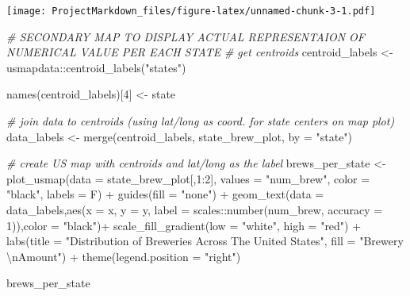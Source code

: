 \documentclass[
]{article}
\newenvironment{Shaded}{\begin{snugshade}}{\end{snugshade}}
\newcommand{\AttributeTok}[1]{\textcolor[rgb]{0.77,0.63,0.00}{#1}}
\newcommand{\CommentTok}[1]{\textcolor[rgb]{0.56,0.35,0.01}{\textit{#1}}}
\newcommand{\DecValTok}[1]{\textcolor[rgb]{0.00,0.00,0.81}{#1}}
\newcommand{\FunctionTok}[1]{\textcolor[rgb]{0.00,0.00,0.00}{#1}}
\newcommand{\NormalTok}[1]{#1}
\newcommand{\OtherTok}[1]{\textcolor[rgb]{0.56,0.35,0.01}{#1}}
\newcommand{\SpecialCharTok}[1]{\textcolor[rgb]{0.00,0.00,0.00}{#1}}
\newcommand{\StringTok}[1]{\textcolor[rgb]{0.31,0.60,0.02}{#1}}
\begin{document}
\texttt{[image: ProjectMarkdown\_files/figure-latex/unnamed-chunk-3-1.pdf]}

\begin{Shaded}
\begin{Highlighting}[]
\CommentTok{\# SECONDARY MAP TO DISPLAY ACTUAL REPRESENTAION OF NUMERICAL VALUE PER EACH STATE }
\CommentTok{\# get centroids }
\NormalTok{centroid\_labels }\OtherTok{\textless{}{-}}\NormalTok{ usmapdata}\SpecialCharTok{::}\FunctionTok{centroid\_labels}\NormalTok{(}\StringTok{"states"}\NormalTok{)}

\FunctionTok{names}\NormalTok{(centroid\_labels)[}\DecValTok{4}\NormalTok{] }\OtherTok{\textless{}{-}} \StringTok{\textquotesingle{}state\textquotesingle{}}

\CommentTok{\# join data to centroids (using lat/long as coord. for state centers on map plot)}
\NormalTok{data\_labels }\OtherTok{\textless{}{-}} \FunctionTok{merge}\NormalTok{(centroid\_labels, state\_brew\_plot, }\AttributeTok{by =} \StringTok{"state"}\NormalTok{)}

\CommentTok{\# create US map with centroids and lat/long as the label}
\NormalTok{brews\_per\_state }\OtherTok{\textless{}{-}} \FunctionTok{plot\_usmap}\NormalTok{(}\AttributeTok{data =}\NormalTok{ state\_brew\_plot[,}\DecValTok{1}\SpecialCharTok{:}\DecValTok{2}\NormalTok{],}
                              \AttributeTok{values =} \StringTok{"num\_brew"}\NormalTok{,}
                              \AttributeTok{color =} \StringTok{"black"}\NormalTok{,}
                              \AttributeTok{labels =}\NormalTok{ F) }\SpecialCharTok{+}
  \FunctionTok{guides}\NormalTok{(}\AttributeTok{fill =} \StringTok{"none"}\NormalTok{) }\SpecialCharTok{+}
  \FunctionTok{geom\_text}\NormalTok{(}\AttributeTok{data =}\NormalTok{ data\_labels,}\FunctionTok{aes}\NormalTok{(}\AttributeTok{x =}\NormalTok{ x, }\AttributeTok{y =}\NormalTok{ y,}
                                   \AttributeTok{label =}\NormalTok{ scales}\SpecialCharTok{::}\FunctionTok{number}\NormalTok{(num\_brew, }\AttributeTok{accuracy =} \DecValTok{1}\NormalTok{)),}\AttributeTok{color =} \StringTok{"black"}\NormalTok{)}\SpecialCharTok{+} 
  \FunctionTok{scale\_fill\_gradient}\NormalTok{(}\AttributeTok{low =} \StringTok{"white"}\NormalTok{, }\AttributeTok{high =} \StringTok{"red"}\NormalTok{) }\SpecialCharTok{+}
  \FunctionTok{labs}\NormalTok{(}\AttributeTok{title =} \StringTok{"Distribution of Breweries Across The United States"}\NormalTok{,}
       \AttributeTok{fill =} \StringTok{"Brewery }\SpecialCharTok{\textbackslash{}n}\StringTok{Amount"}\NormalTok{) }\SpecialCharTok{+}
  \FunctionTok{theme}\NormalTok{(}\AttributeTok{legend.position =} \StringTok{"right"}\NormalTok{)}

\NormalTok{brews\_per\_state}
\end{Highlighting}
\end{Shaded}
\end{document}
